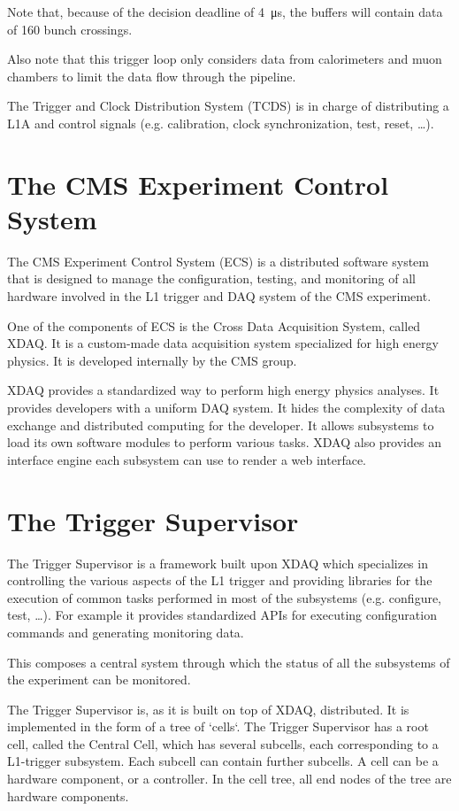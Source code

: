 Note that, because of the decision deadline of \SI{4}{\micro\second}, the
buffers will contain data of 160 bunch crossings.

Also note that this trigger loop only considers data from calorimeters and
muon chambers to limit the data flow through the pipeline.

The Trigger and Clock Distribution System (TCDS) is in charge of distributing a L1A
and control signals (e.g. calibration, clock synchronization, test, reset, \ldots).

\section{The CMS Experiment Control System}
The CMS Experiment Control System (ECS) is a distributed software system that
is designed to manage the configuration, testing, and monitoring of all hardware
involved in the L1 trigger and DAQ system of the CMS experiment.

One of the components of ECS is the Cross Data Acquisition System, called XDAQ.
It is a custom-made data acquisition system specialized for high energy physics.
It is developed internally by the CMS group.


XDAQ provides a standardized way to perform high energy physics analyses. It
provides developers with a uniform DAQ system. It hides the complexity of data
exchange and distributed computing for the developer.
It allows subsystems to load its own software modules to perform various tasks.
XDAQ also provides an interface engine each subsystem can use to render a web
interface.

\section{The Trigger Supervisor}
The Trigger Supervisor is a framework built upon XDAQ which specializes in
controlling the various aspects of the L1 trigger and providing libraries for
the execution of common tasks performed in most of the subsystems (e.g. configure, test, \ldots).
For example it provides standardized APIs for executing configuration commands and
generating monitoring data.

This composes a central system through which the status of all the subsystems
of the experiment can be monitored.

The Trigger Supervisor is, as it is built on top of XDAQ, distributed.
It is implemented in the form of a tree of `cells`.
The Trigger Supervisor has a root cell, called the Central Cell, which has
several subcells, each corresponding to a L1-trigger subsystem.
Each subcell can contain further subcells. A cell can be a hardware component,
or a controller. In the cell tree, all end nodes of the tree are hardware components.

